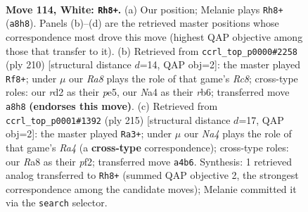 \documentclass[11pt]{article}
\begin{document}
\clearpage

\begin{figure}[p]\centering
\begin{subfigure}{0.46\textwidth}\centering
\resizebox{\linewidth}{!}{%
\newchessgame
\chessboard[
  setfen={R7/6p1/5p1k/7p/N6P/6PK/3r4/8 w - - 52 114},
  showmover=false,
  pgfstyle=straightmove, color=movearrow, markmove={a8-h8}
]}
\caption{}
\end{subfigure}\hfill
\begin{subfigure}{0.46\textwidth}\centering
\resizebox{\linewidth}{!}{%
\newchessgame
\chessboard[
  setfen={2R5/8/1r3k2/4p1p1/5pP1/5P2/4PK2/8 w - - 14 106},
  showmover=false,
  pgfstyle=straightmove, color=movearrow, markmove={c8-f8}
]}
\caption{}
\end{subfigure}
\\[4pt]
\begin{subfigure}{0.46\textwidth}\centering
\resizebox{\linewidth}{!}{%
\newchessgame
\chessboard[
  setfen={1R6/5pk1/6p1/r6p/7P/5KP1/5P2/8 b - - 34 108},
  showmover=false,
  pgfstyle=straightmove, color=movearrow, markmove={a5-a3}
]}
\caption{}
\end{subfigure}\hfill

\caption{\textbf{Move 114, White: \texttt{Rh8+}.} (a) Our position; Melanie plays \texttt{Rh8+} (\texttt{a8h8}). Panels (b)--(d) are the retrieved master positions whose correspondence most drove this move (highest QAP objective among those that transfer to it). (b) Retrieved from \texttt{ccrl\_top\_p0000\#2258} (ply 210) [structural distance $d$=14, QAP obj=2]: the master played \texttt{Rf8+}; under $\mu$ our \emph{Ra8} plays the role of that game's \emph{Rc8}; cross-type roles: our \emph{r}d2 as their \emph{p}e5, our \emph{N}a4 as their \emph{r}b6; transferred move \texttt{a8h8} \textbf{(endorses this move)}. (c) Retrieved from \texttt{ccrl\_top\_p0001\#1392} (ply 215) [structural distance $d$=17, QAP obj=2]: the master played \texttt{Ra3+}; under $\mu$ our \emph{Na4} plays the role of that game's \emph{Ra4} (a \textbf{cross-type} correspondence); cross-type roles: our \emph{R}a8 as their \emph{p}f2; transferred move \texttt{a4b6}. Synthesis: 1 retrieved analog transferred to \texttt{Rh8+} (summed QAP objective 2, the strongest correspondence among the candidate moves); Melanie committed it via the \texttt{search} selector.}
\label{fig:thought-m226}
\end{figure}

\clearpage
\end{document}
